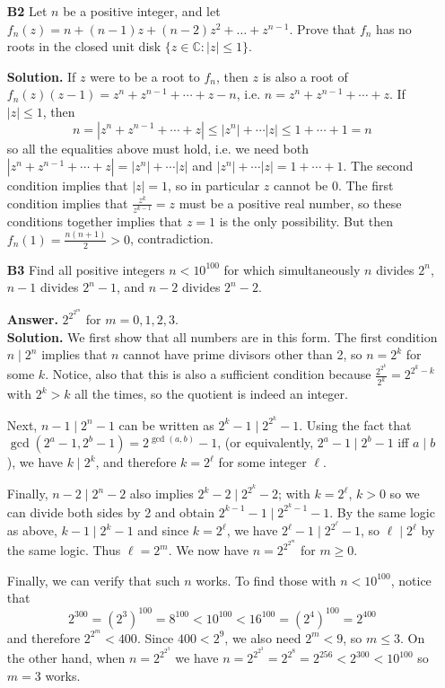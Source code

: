 \documentclass[11pt,a4paper]{article}
\newcommand{\<}{\langle}
\renewcommand{\>}{\rangle}
\begin{document}
\begin{enumerate}
	\item [\textbf{B2}]
	Let $n$ be a positive integer, and let $f_n(z) = n + (n-1)z + (n-2)z^2 + \dots + z^{n-1}$. Prove that $f_n$ has no roots in the closed unit disk $\{z \in \mathbb{C}: |z| \le 1\}$.
	
	\textbf{Solution.} 
	If $z$ were to be a root to $f_n$, then $z$ is also a root of 
	$f_n(z)(z-1)=z^n+z^{n-1}+\cdots + z - n$, i.e. 
	$n=z^n+z^{n-1}+\cdots + z$. 
	If $|z|\le 1$, then 
	\[n=|z^n+z^{n-1}+\cdots + z|
	\le |z^n|+\cdots |z|
	\le 1+\cdots + 1
	=n
	\]
	so all the equalities above must hold, i.e. we need both $|z^n+z^{n-1}+\cdots + z| = |z^n|+\cdots |z|$ and 
	$|z^n|+\cdots |z|=1+\cdots +1$. The second condition implies that $|z|=1$, so in particular $z$ cannot be 0. 
	The first condition implies that $\frac{z^k}{z^{k-1}}=z$ must be a positive real number, so these conditions together implies that $z=1$ is the only possibility. 
	But then $f_n(1)=\frac{n(n+1)}{2}>0$, contradiction. 
	
	\item[\textbf{B3}] Find all positive integers $n < 10^{100}$ for which simultaneously $n$ divides $2^n$, $n-1$ divides $2^n - 1$, and $n-2$ divides $2^n - 2$.
	
	\textbf{Answer.} $2^{2^{2^m}}$ for $m=0,1,2,3$. \\
	\textbf{Solution.} We first show that all numbers are in this form. The first condition $n\mid 2^n$ implies that $n$ cannot have prime divisors other than 2, so $n=2^k$ for some $k$. Notice, also that this is also a sufficient condition because $\frac{2^{2^k}}{2^k}=2^{2^k-k}$ with $2^k>k$ all the times, so the quotient is indeed an integer.  
	
	Next, $n-1\mid 2^n-1$ can be written as $2^k-1\mid 2^{2^k}-1$. Using the fact that $\gcd(2^a-1, 2^b-1)=2^{\gcd (a, b)}-1$, (or equivalently, $2^a-1\mid 2^b-1$ iff $a\mid b$), we have $k\mid 2^k$, and therefore $k=2^{\ell}$ for some integer $\ell$. 
	
	Finally, $n-2\mid 2^n-2$ also implies $2^{k}-2\mid 2^{2^k}-2$; 
	with $k=2^{\ell}$, $k>0$ so we can divide both sides by 2 and obtain 
	$2^{k-1}-1\mid 2^{2^k-1}-1$. 
	By the same logic as above, $k-1\mid 2^k-1$ and since $k=2^{\ell}$, we have $2^{\ell}-1\mid 2^{2^{\ell}}-1$, so $\ell\mid 2^{\ell}$ by the same logic. Thus $\ell=2^m$. We now have $n=2^{2^{2^m}}$ for $m\ge 0$. 
	
	Finally, we can verify that such $n$ works. To find those with $n<10^{100}$, notice that 
	\[2^{300}=(2^3)^{100}=8^{100}<10^{100}<16^{100}=(2^4)^{100}=2^{400}
	\]
	and therefore $2^{2^m}<400$. Since $400<2^9$, we also need $2^m<9$, so $m\le 3$. 
	On the other hand, when $n=2^{2^{2^3}}$ we have $n=2^{2^{2^3}}=2^{2^8}=2^{256}<2^{300}<10^{100}$ so $m=3$ works. 
	

\end{enumerate}
\end{document}
